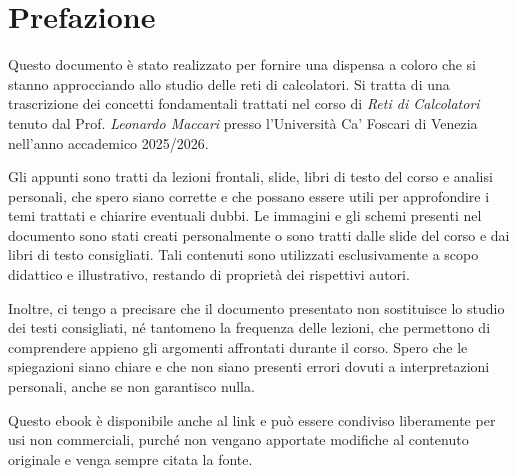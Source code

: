 \newpage
\chapter*{Prefazione}

Questo documento è stato realizzato per fornire una dispensa a coloro che si stanno approcciando allo studio delle reti di calcolatori.
Si tratta di una trascrizione dei concetti fondamentali trattati nel corso di \textit{Reti di Calcolatori} tenuto dal Prof. \textit{Leonardo Maccari} presso l'Università Ca' Foscari di Venezia nell'anno accademico 2025/2026.

\vspace{0.5 em}

Gli appunti sono tratti da lezioni frontali, slide, libri di testo del corso e analisi personali, che spero siano corrette e che possano essere utili per approfondire i temi trattati e chiarire eventuali dubbi.
Le immagini e gli schemi presenti nel documento sono stati creati personalmente o sono tratti dalle slide del corso e dai libri di testo consigliati. Tali contenuti sono utilizzati esclusivamente a scopo didattico e illustrativo, restando di proprietà dei rispettivi autori.

\vspace{0.5 em}

Inoltre, ci tengo a precisare che il documento presentato non sostituisce lo studio dei testi consigliati, né tantomeno la frequenza delle lezioni, che permettono di comprendere appieno gli argomenti affrontati durante il corso.
Spero che le spiegazioni siano chiare e che non siano presenti errori dovuti a interpretazioni personali, anche se non garantisco nulla.

\vspace{0.5 em}

Questo ebook è disponibile anche al link  e può essere condiviso liberamente per usi non commerciali, purché non vengano apportate modifiche al contenuto originale e venga sempre citata la fonte.